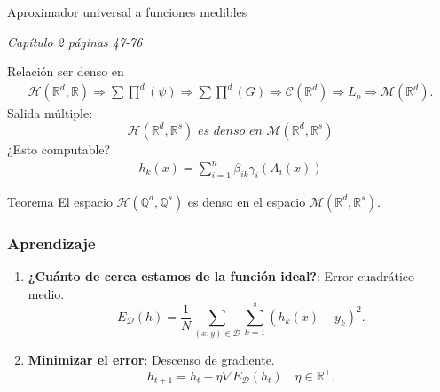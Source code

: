 \documentclass{beamer}
\newcommand{\R}{\mathbb{R}}
\newcommand{\Q}{\mathbb{Q}}
\newcommand{\pmcg}{ \sum \prod^d (G)} %
\newcommand{\fC}{\mathcal{C}(\R^d)} %
\newcommand{\fM}{\mathcal{M}(\R^d)} %
\newcommand{\rrnn}{ \mathcal{H}(\R^d,\R)} %
\newcommand{\rrnng}{ \sum \prod^d (\psi)} %
\begin{document}
\begin{frame}{Aproximador universal a funciones medibles}
    \label{univeral-aproximator}
    \begin{flushright}
        \textit{Capítulo 2 páginas 47-76}
    \end{flushright}
    Relación ser denso en 
    \begin{align*}
        \rrnn 
            \Rightarrow  
        \rrnng 
            \Rightarrow
        \pmcg
            \Rightarrow  
        \fC    
            \Rightarrow 
        L_p
        \Rightarrow 
        \fM .
    \end{align*}
    Salida múltiple: 
    \begin{equation*}
        \mathcal{H}(\R^d,\R^s)  \textit{ es denso en } \mathcal{M}(\R^d,\R^s) 
    \end{equation*}
    \pause
    ¿Esto computable? 
    \begin{align*}
        h_k(x) = 
        \sum_{i=1}^{n} 
        {\beta_{i k}} \gamma_{i}( A_{i}(x))
\end{align*}
    \pause
    \begin{exampleblock}{Teorema}
        El espacio $\mathcal{H}(\Q^d, \Q^s)$ es denso en el espacio $\mathcal{M}(\R^d,\R^s)$. 
    \end{exampleblock}
\end{frame}



\begin{frame}
\frametitle{Aprendizaje} 
\begin{enumerate}
    \item \textbf{¿Cuánto de cerca estamos de la función ideal?}: Error cuadrático medio. 
    \begin{equation*}
        E_{\mathcal{D}}(h) = \frac{1}{N} \sum_{(x,y) \in \mathcal{D}} \sum_{k=1}^s(h_k(x)- y_k)^2. 
    \end{equation*}
    \pause 
   \item  \textbf{Minimizar el error}: Descenso de gradiente. 
    \begin{equation*}
        h_{t+1}  = h_t - \eta \nabla E_{\mathcal{D}}(h_t) \quad \eta \in \R^+.
    \end{equation*}  

\end{enumerate}  
\end{frame}
\end{document}
